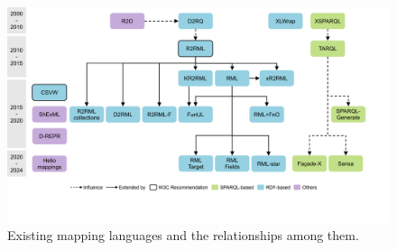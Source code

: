 \begin{figure}[h]
\centering
\includegraphics[width=1\linewidth]{figures/chp2_mapping_languages}
\caption[Existing mapping languages and the relationships among them]{Existing mapping languages and the relationships among them.}
\label{fig:chp2_mapping_languages}
\end{figure}

